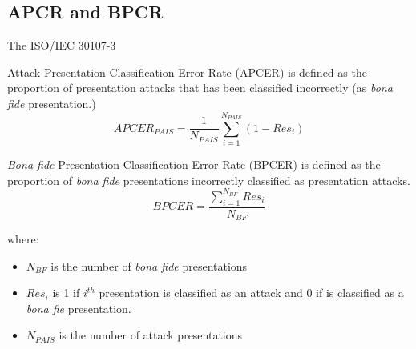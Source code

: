 \subsection{APCR and BPCR}
The ISO/IEC 30107-3 \cite{ISO}

Attack Presentation Classification Error Rate (APCER) is defined as the proportion of presentation attacks that has been classified incorrectly (as \textit{bona fide} presentation.)\\

\begin{equation}
  APCER_{PAIS} = \frac{1}{N_{PAIS}}\sum_{i=1}^{N_{PAIS}}(1 - Res_{i})
\end{equation}

\textit{Bona fide} Presentation Classification Error Rate (BPCER) is defined as the proportion of \textit{bona fide} presentations  incorrectly classified as presentation attacks.\\

\begin{equation}
  BPCER = \frac{\sum_{i=1}^{N_{BF}}Res_{i}}{N_{BF}}
\end{equation}


where: \begin{itemize}
\item $N_{BF}$ is the number of \textit{bona fide} presentations
\item $Res_{i}$ is 1 if $i^{th}$ presentation is classified as an attack and 0 if is classified as a \textit{bona fie} presentation.
\item $N_{PAIS}$ is the number of attack presentations
\end{itemize}

